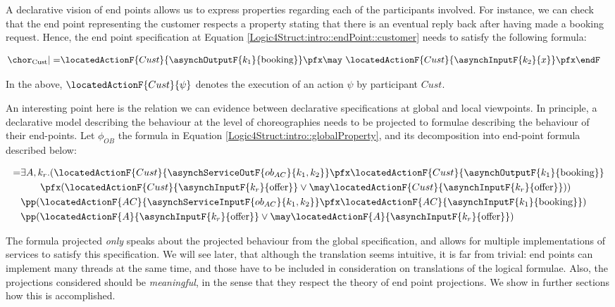 A declarative vision of end points allows us to express properties
regarding each of the participants involved. For instance, we can
check that the end point representing the customer
respects a property stating that there is an eventual reply back after
having made a booking request. 
 Hence, the end point specification at Equation
\ref{Logic4Struct:intro::endPoint::customer} needs to satisfy the following formula:


\begin{align}
   \chor_{\text{Cust}} |=&
   \locatedActionF{Cust}{\asynchOutputF{k_1}{\text{booking}}} \pfx
   \may ~   \locatedActionF{Cust}{\asynchInputF{k_2}{x}} \pfx \endF
\end{align}

In the above,  $\locatedActionF{Cust}{\psi}$ denotes the execution of an action
$\psi$ by participant $Cust$.

An interesting point here is the relation we can evidence
between declarative specifications at global and local
viewpoints. In principle, a declarative model describing the behaviour
at the level of choreographies needs to be projected to formulae
describing the behaviour of their end-points.  Let $\phi_{OB}$ the formula
in Equation \ref{Logic4Struct:intro::globalProperty}, and its
decomposition into end-point formula described below:


\begin{align}
  [| \phi_{OB} |] = & \exists A, k_r. 
  (\locatedActionF{Cust}{\asynchServiceOutF{ob_{AC}}{k_1,k_2}} \pfx
  \locatedActionF{Cust}{\asynchOutputF{k_{1}}{\text{booking}}}  \\
   & \qquad \pfx ( \locatedActionF{Cust}{\asynchInputF{k_{r}}{\text{offer}}} \lor
   \may \locatedActionF{Cust}{\asynchInputF{k_{r}}{\text{offer}}} )) \notag
   \\
   & \pp (\locatedActionF{AC}{\asynchServiceInputF{ob_{AC}}{k_1,k_2}}
   \pfx   \locatedActionF{AC}{\asynchInputF{k_{1}}{\text{booking}}})
   \notag\\
   & \pp (\locatedActionF{A}{\asynchInputF{k_{r}}{\text{offer}}} \lor
   \may \locatedActionF{A}{\asynchInputF{k_{r}}{\text{offer}}})
\end{align}

The formula projected \emph{only} speaks about the projected behaviour
from the global specification, and allows for multiple implementations
of services to satisfy this specification. We will see later, that
although the translation seems intuitive, it is far from trivial: end
points can implement many threads at the same time, and those have to
be included in consideration on translations of the logical
formulae. Also, the projections considered should be
\emph{meaningful}, in the sense that they respect the theory of end
point projections. We show in further sections how this is accomplished.


